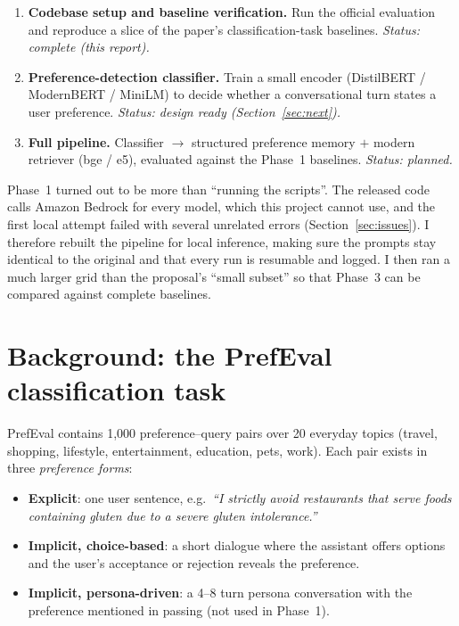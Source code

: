 \documentclass[11pt,a4paper]{article}
\begin{document}
\begin{enumerate}[label=\textbf{Phase \arabic*:},leftmargin=5.2em]
  \item \textbf{Codebase setup and baseline verification.} Run the official evaluation and reproduce a slice of the paper's
        classification-task baselines. \emph{Status: complete (this report).}
  \item \textbf{Preference-detection classifier.} Train a small encoder (DistilBERT / ModernBERT / MiniLM) to decide
        whether a conversational turn states a user preference. \emph{Status: design ready (Section~\ref{sec:next}).}
  \item \textbf{Full pipeline.} Classifier $\rightarrow$ structured preference memory $+$ modern retriever (bge / e5),
        evaluated against the Phase~1 baselines. \emph{Status: planned.}
\end{enumerate}

\noindent Phase~1 turned out to be more than ``running the scripts''. The released code calls Amazon Bedrock for every model,
which this project cannot use, and the first local attempt failed with several unrelated errors (Section~\ref{sec:issues}).
I therefore rebuilt the pipeline for local inference, making sure the prompts stay identical to the original and that every run is
resumable and logged. I then ran a much larger grid than the proposal's ``small subset'' so that Phase~3 can be compared
against complete baselines.

\section{Background: the PrefEval classification task}

PrefEval contains 1{,}000 preference--query pairs over 20 everyday topics (travel, shopping, lifestyle, entertainment,
education, pets, work). Each pair exists in three \emph{preference forms}:
\begin{itemize}
  \item \textbf{Explicit}: one user sentence, e.g.\ \emph{``I strictly avoid restaurants that serve foods containing gluten
        due to a severe gluten intolerance.''}
  \item \textbf{Implicit, choice-based}: a short dialogue where the assistant offers options and the user's
        acceptance or rejection reveals the preference.
  \item \textbf{Implicit, persona-driven}: a 4--8 turn persona conversation with the preference mentioned in passing
        (not used in Phase~1).
\end{itemize}
\end{document}
